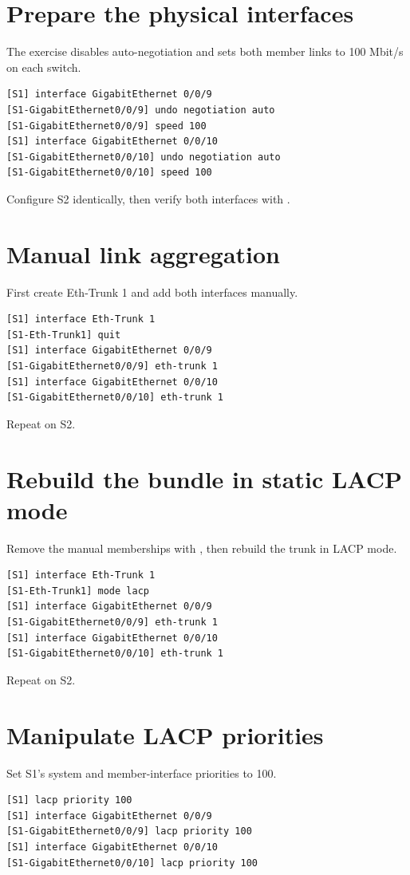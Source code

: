 
\section{Prepare the physical interfaces}
The exercise disables auto-negotiation and sets both member links to 100 Mbit/s on each switch.
\begin{lstlisting}[style=dcnterminal]
[S1] interface GigabitEthernet 0/0/9
[S1-GigabitEthernet0/0/9] undo negotiation auto
[S1-GigabitEthernet0/0/9] speed 100
[S1] interface GigabitEthernet 0/0/10
[S1-GigabitEthernet0/0/10] undo negotiation auto
[S1-GigabitEthernet0/0/10] speed 100
\end{lstlisting}
Configure S2 identically, then verify both interfaces with .

\section{Manual link aggregation}
First create Eth-Trunk 1 and add both interfaces manually.
\begin{lstlisting}[style=dcnterminal]
[S1] interface Eth-Trunk 1
[S1-Eth-Trunk1] quit
[S1] interface GigabitEthernet 0/0/9
[S1-GigabitEthernet0/0/9] eth-trunk 1
[S1] interface GigabitEthernet 0/0/10
[S1-GigabitEthernet0/0/10] eth-trunk 1
\end{lstlisting}
Repeat on S2.

\section{Rebuild the bundle in static LACP mode}
Remove the manual memberships with , then rebuild the trunk in LACP mode.
\begin{lstlisting}[style=dcnterminal]
[S1] interface Eth-Trunk 1
[S1-Eth-Trunk1] mode lacp
[S1] interface GigabitEthernet 0/0/9
[S1-GigabitEthernet0/0/9] eth-trunk 1
[S1] interface GigabitEthernet 0/0/10
[S1-GigabitEthernet0/0/10] eth-trunk 1
\end{lstlisting}
Repeat on S2.

\section{Manipulate LACP priorities}
Set S1's system and member-interface priorities to 100.
\begin{lstlisting}[style=dcnterminal]
[S1] lacp priority 100
[S1] interface GigabitEthernet 0/0/9
[S1-GigabitEthernet0/0/9] lacp priority 100
[S1] interface GigabitEthernet 0/0/10
[S1-GigabitEthernet0/0/10] lacp priority 100
\end{lstlisting}

